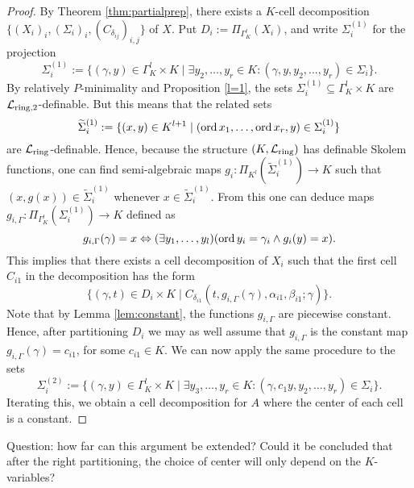 \begin{proof}
By Theorem \ref{thm:partialprep}, there exists a $K$-cell decomposition $\{(X_i)_i,(\Sigma_i)_i, (C_{\delta_{ij}})_{i,j}\}$ of $X$. Put $D_i := \Pi_{\Gamma_K^l}(X_i)$, and write $\Sigma^{(1)}_i$ for the projection
\[\Sigma_i^{(1)}:= \{(\gamma, y) \in \Gamma_K^l \times K \mid \exists y_2, \ldots, y_r \in K: (\gamma, y, y_2, \ldots, y_r) \in \Sigma_i\}.\]
By relatively $P$-minimality and Proposition \ref{l=1}, the sets $\Sigma_i^{(1)} \subseteq \Gamma_K^l \times K$ are $\mathcal{L}_{\text{ring,2}}$-definable. But this means that the related sets
\[\widetilde{\Sigma}_i^{(1)}:= \{(x,y) \in K^{l+1} \mid (\operatorname{ord} x_1, \ldots, \operatorname{ord} x_r, y) \in \Sigma_i^{(1)}\}\] are $\mathcal{L}_{\text{ring}}$-definable.
Hence, because the structure $(K,\mathcal{L}_{\text{ring}})$ has definable Skolem functions, one can find semi-algebraic maps $g_i:\Pi_{K^l}(\widetilde{\Sigma}_i^{(1)}) \to K$ such that $(x, g(x)) \in \widetilde{\Sigma}_i^{(1)}$ whenever $x \in \widetilde{\Sigma}_i^{(1)}$. From this one can deduce  maps
$g_{i,\Gamma}: \Pi_{\Gamma_K^l}(\Sigma_i^{(1)})\to K$ defined as
\[g_{i,\Gamma}(\gamma) = x \Leftrightarrow (\exists y_1, \ldots, y_l)(\operatorname{ord} y_i = \gamma_i \wedge g_i(y) =x).\]
This implies that there exists a cell decomposition of $X_i$ such that the first cell $C_{i1}$ in the decomposition has the form
\[\{(\gamma, t) \in D_i \times K \mid C_{\delta_{i1}}(t, g_{i,\Gamma}(\gamma), \alpha_{i1}, \beta_{i1};\gamma)\}.\]
Note that by Lemma \ref{lem:constant}, the functions $g_{i,\Gamma}$ are piecewise constant. Hence, after partitioning $D_i$ we may as well assume that $g_{i,\Gamma}$ is the constant map $g_{i,\Gamma}(\gamma) = c_{i1}$, for some $c_{i1} \in K$.
We can now apply the same procedure to the sets 
\[\Sigma_i^{(2)}:= \{(\gamma, y) \in \Gamma_K^l \times K \mid \exists y_3, \ldots, y_r \in K: (\gamma, c_1 y, y_2, \ldots, y_r) \in \Sigma_i\}.\]
Iterating this, we obtain a cell decomposition for $A$ where the center of each cell is a constant. 
\end{proof}
{\color{blue} Question: how far can this argument be extended? Could it be concluded that after the right partitioning, the choice of center will only depend on the $K$-variables?}

